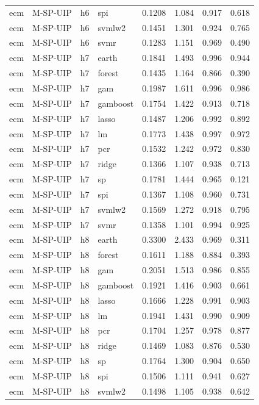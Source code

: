 \begin{ThreePartTable}
\begin{longtable}[t]{llclcccc}
ecm & M-SP-UIP & h6 & spi & 0.1208 & 1.084 & 0.917 & 0.618\\
ecm & M-SP-UIP & h6 & svmlw2 & 0.1451 & 1.301 & 0.924 & 0.765\\
ecm & M-SP-UIP & h6 & svmr & 0.1283 & 1.151 & 0.969 & 0.490\\
\addlinespace
ecm & M-SP-UIP & h7 & earth & 0.1841 & 1.493 & 0.996 & 0.944\\
ecm & M-SP-UIP & h7 & forest & 0.1435 & 1.164 & 0.866 & 0.390\\
ecm & M-SP-UIP & h7 & gam & 0.1987 & 1.611 & 0.996 & 0.986\\
ecm & M-SP-UIP & h7 & gamboost & 0.1754 & 1.422 & 0.913 & 0.718\\
ecm & M-SP-UIP & h7 & lasso & 0.1487 & 1.206 & 0.992 & 0.892\\
ecm & M-SP-UIP & h7 & lm & 0.1773 & 1.438 & 0.997 & 0.972\\
ecm & M-SP-UIP & h7 & pcr & 0.1532 & 1.242 & 0.972 & 0.830\\
ecm & M-SP-UIP & h7 & ridge & 0.1366 & 1.107 & 0.938 & 0.713\\
ecm & M-SP-UIP & h7 & sp & 0.1781 & 1.444 & 0.965 & 0.121\\
ecm & M-SP-UIP & h7 & spi & 0.1367 & 1.108 & 0.960 & 0.731\\
ecm & M-SP-UIP & h7 & svmlw2 & 0.1569 & 1.272 & 0.918 & 0.795\\
ecm & M-SP-UIP & h7 & svmr & 0.1358 & 1.101 & 0.994 & 0.925\\
\addlinespace
ecm & M-SP-UIP & h8 & earth & 0.3300 & 2.433 & 0.969 & 0.311\\
ecm & M-SP-UIP & h8 & forest & 0.1611 & 1.188 & 0.884 & 0.393\\
ecm & M-SP-UIP & h8 & gam & 0.2051 & 1.513 & 0.986 & 0.855\\
ecm & M-SP-UIP & h8 & gamboost & 0.1921 & 1.416 & 0.903 & 0.661\\
ecm & M-SP-UIP & h8 & lasso & 0.1666 & 1.228 & 0.991 & 0.903\\
ecm & M-SP-UIP & h8 & lm & 0.1941 & 1.431 & 0.990 & 0.909\\
ecm & M-SP-UIP & h8 & pcr & 0.1704 & 1.257 & 0.978 & 0.877\\
ecm & M-SP-UIP & h8 & ridge & 0.1469 & 1.083 & 0.876 & 0.530\\
ecm & M-SP-UIP & h8 & sp & 0.1764 & 1.300 & 0.904 & 0.650\\
ecm & M-SP-UIP & h8 & spi & 0.1506 & 1.111 & 0.941 & 0.627\\
ecm & M-SP-UIP & h8 & svmlw2 & 0.1498 & 1.105 & 0.938 & 0.642\\

\end{longtable}
\end{ThreePartTable}
